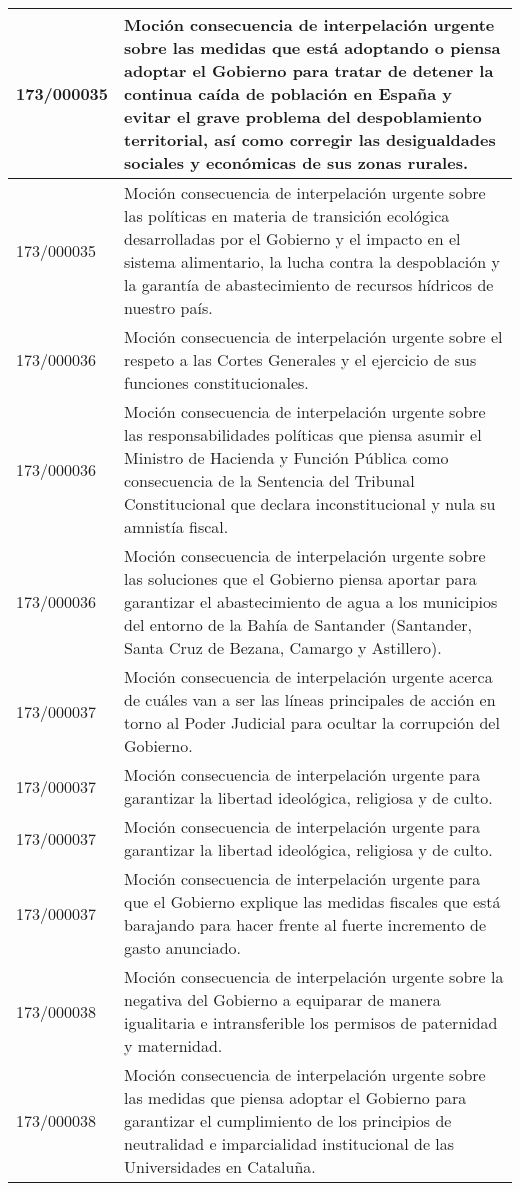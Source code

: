{\begin{table}[H]
\begin{center}
\begin{tabularx}{\linewidth}{| l | X |}
\hline
173/000035 & Moción consecuencia de interpelación urgente sobre las medidas que está adoptando o piensa adoptar el Gobierno para tratar de detener la continua caída de población en España y evitar el grave problema del despoblamiento territorial, así como corregir las desigualdades sociales y económicas de sus zonas rurales. \\
\hline
173/000035 & Moción consecuencia de interpelación urgente sobre las políticas en materia de transición ecológica desarrolladas por el Gobierno y el impacto en el sistema alimentario, la lucha contra la despoblación y la garantía de abastecimiento de recursos hídricos de nuestro país. \\
\hline
173/000036 & Moción consecuencia de interpelación urgente sobre el respeto a las Cortes Generales y el ejercicio de sus funciones constitucionales. \\
\hline
173/000036 & Moción consecuencia de interpelación urgente sobre las responsabilidades políticas que piensa asumir el Ministro de Hacienda y Función Pública como consecuencia de la Sentencia del Tribunal Constitucional que declara inconstitucional y nula su amnistía fiscal. \\
\hline
173/000036 & Moción consecuencia de interpelación urgente sobre las soluciones que el Gobierno piensa aportar para garantizar el abastecimiento de agua a los municipios del entorno de la Bahía de Santander (Santander, Santa Cruz de Bezana, Camargo y Astillero). \\
\hline
173/000037 & Moción consecuencia de interpelación urgente acerca de cuáles van a ser las líneas principales de acción en torno al Poder Judicial para ocultar la corrupción del Gobierno. \\
\hline
173/000037 & Moción consecuencia de interpelación urgente para garantizar la libertad ideológica, religiosa y de culto. \\
\hline
173/000037 & Moción consecuencia de interpelación urgente para garantizar la libertad ideológica, religiosa y de culto. \\
\hline
173/000037 & Moción consecuencia de interpelación urgente para que el Gobierno explique las medidas fiscales que está barajando para hacer frente al fuerte incremento de gasto anunciado. \\
\hline
173/000038 & Moción consecuencia de interpelación urgente sobre la negativa del Gobierno a equiparar de manera igualitaria e intransferible los permisos de paternidad y maternidad. \\
\hline
173/000038 & Moción consecuencia de interpelación urgente sobre las medidas que piensa adoptar el Gobierno para garantizar el cumplimiento de los principios de neutralidad e imparcialidad institucional de las Universidades en Cataluña. \\

\end{tabularx}
\end{center}
\end{table}}
